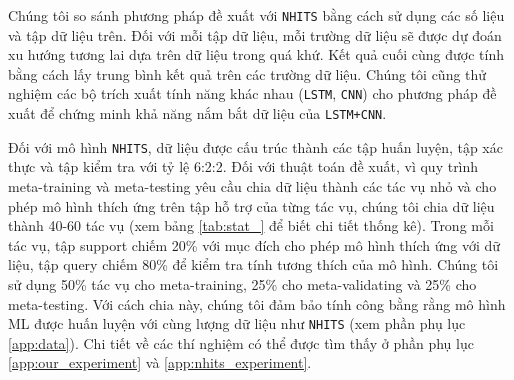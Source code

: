 \documentclass[aps,prb,groupedaddress,twocolumn,showpacs,dvipdfmx,superscriptaddress,pdftex]{revtex4-2}
\begin{document}
Chúng tôi so sánh phương pháp đề xuất với \verb|NHITS| bằng cách sử dụng các số liệu và tập dữ liệu trên. Đối với mỗi tập dữ liệu, mỗi trường dữ liệu sẽ được dự đoán xu hướng tương lai dựa trên dữ liệu trong quá khứ. Kết quả cuối cùng được tính bằng cách lấy trung bình kết quả trên các trường dữ liệu. Chúng tôi cũng thử nghiệm các bộ trích xuất tính năng khác nhau (\verb|LSTM|, \verb|CNN|) cho phương pháp đề xuất để chứng minh khả năng nắm bắt dữ liệu của \verb|LSTM+CNN|.


\vspace{2mm}

Đối với mô hình \verb|NHITS|, dữ liệu được cấu trúc thành các tập huấn luyện, tập xác thực và tập kiểm tra với tỷ lệ 6:2:2. Đối với thuật toán đề xuất, vì quy trình meta-training và meta-testing yêu cầu chia dữ liệu thành các tác vụ nhỏ và cho phép mô hình thích ứng trên tập hỗ trợ của từng tác vụ, chúng tôi chia dữ liệu thành 40-60 tác vụ (xem bảng \ref{tab:stat_} để biết chi tiết thống kê). Trong mỗi tác vụ, tập support chiếm 20\% với mục đích cho phép mô hình thích ứng với dữ liệu, tập query chiếm 80\% để kiểm tra tính tương thích của mô hình. Chúng tôi sử dụng 50\% tác vụ cho meta-training, 25\% cho meta-validating và 25\% cho meta-testing. Với cách chia này, chúng tôi đảm bảo tính công bằng rằng mô hình ML được huấn luyện với cùng lượng dữ liệu như \verb|NHITS| (xem phần phụ lục \ref{app:data}). Chi tiết về các thí nghiệm có thể được tìm thấy ở phần phụ lục \ref{app:our_experiment} và \ref{app:nhits_experiment}.

\end{document}
